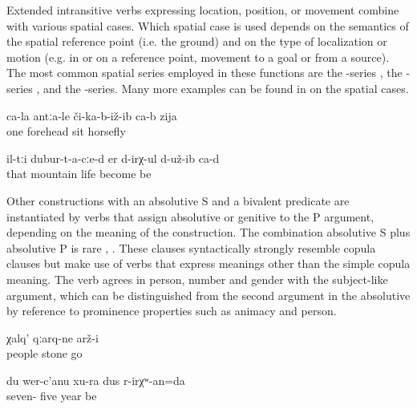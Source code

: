 Extended intransitive verbs expressing location, position, or movement combine with various spatial cases. Which spatial case is used depends on the semantics of the spatial reference point (i.e. the ground) and on the type of localization or motion (e.g. in or on a reference point, movement to a goal or from a source). The most common spatial series employed in these functions are the -series , the -series , and the -series. Many more examples can be found in  on the spatial cases.
%
\begin{exe}
	\ex	\label{ex:A horsefly sat down on the forehead of one (man)}
	\gll	ca-la	antːa-le	či-ka-b-iž-ib	ca-b	zija\\
		one	forehead	sit		horsefly\\
	\glt	{}

	\ex	\label{ex:(Apparently) they (=the animals) lived in the mountains}
	\gll	il-tːi	dubur-t-a-cːe-d	er	d-irχ-ul	d-už-ib	ca-d\\
		that	mountain	life	become	be \\
	\glt	{}
\end{exe}

Other constructions with an absolutive S and a bivalent predicate are instantiated by verbs that assign absolutive or genitive to the P argument, depending on the meaning of the construction. The combination absolutive S plus absolutive P is rare , . These clauses syntactically strongly resemble copula clauses but make use of verbs that express meanings other than the simple copula meaning. The verb agrees in person, number and gender with the subject-like argument, which can be distinguished from the second argument in the absolutive by reference to prominence properties such as animacy and person.
%
\begin{exe}
	\ex	\label{ex:The people turned into stones}
	\gll	χalq'	qːarq-ne	arž-i\\
		people	stone	go\\
	\glt	{}

	\ex	\label{ex:I will be 75 years old}
	\gll	du	wer-c'anu	xu-ra	dus	r-irχʷ-an=da\\
			seven-	five year	be\\
	\glt	{}
\end{exe}

